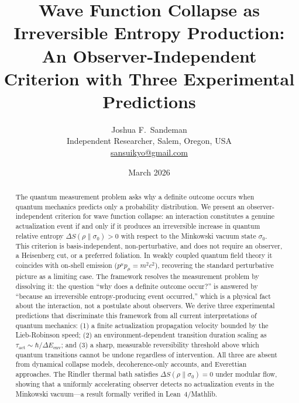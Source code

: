 \documentclass[11pt,twocolumn]{article}
\newcommand{\tauact}{\tau_{\mathrm{act}}}
\begin{document}
\title{Wave Function Collapse as Irreversible Entropy Production:\\
An Observer-Independent Criterion with Three Experimental Predictions}

\author{Joshua F.~Sandeman\\
\small Independent Researcher, Salem, Oregon, USA\\
\small \href{mailto:sansuikyo@gmail.com}{sansuikyo@gmail.com}}

\date{March 2026}

\begin{abstract}
The quantum measurement problem asks why a definite outcome occurs
when quantum mechanics predicts only a probability distribution.
We present an observer-independent criterion for wave function
collapse: an interaction constitutes a genuine actualization event
if and only if it produces an irreversible increase in quantum relative
entropy $\Delta S(\rho\|\sigma_0) > 0$ with respect to the Minkowski
vacuum state $\sigma_0$.
This criterion is basis-independent, non-perturbative, and does
not require an observer, a Heisenberg cut, or a preferred foliation.
In weakly coupled quantum field theory it coincides with on-shell
emission ($p^\mu p_\mu = m^2 c^2$), recovering the standard perturbative
picture as a limiting case.
The framework resolves the measurement problem by dissolving it:
the question ``why does a definite outcome occur?'' is answered by
``because an irreversible entropy-producing event occurred,'' which
is a physical fact about the interaction, not a postulate about
observers.
We derive three experimental predictions that discriminate
this framework from all current interpretations of quantum mechanics:
(1) a finite actualization propagation velocity bounded by the
Lieb-Robinson speed; (2) an environment-dependent transition
duration scaling as $\tauact \sim \hbar/\Delta E_{\mathrm{env}}$;
and (3) a sharp, measurable reversibility threshold above which
quantum transitions cannot be undone regardless of intervention.
All three are absent from dynamical collapse models, decoherence-only
accounts, and Everettian approaches.
The Rindler thermal bath satisfies $\Delta S(\rho\|\sigma_0) = 0$
under modular flow, showing that a uniformly accelerating observer
detects no actualization events in the Minkowski vacuum---a result
formally verified in Lean~4/Mathlib.
\end{abstract}

\maketitle
\end{document}
